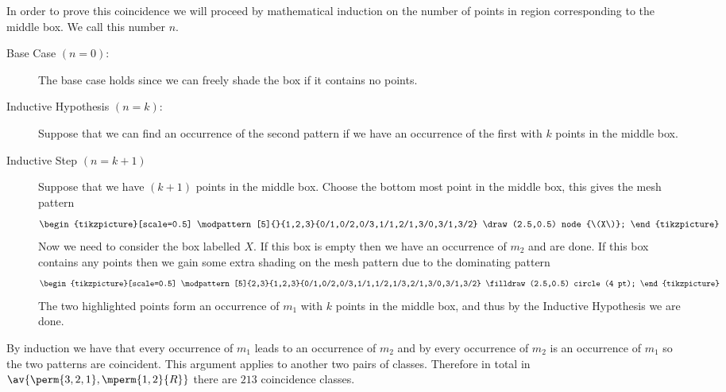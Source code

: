In order to prove this coincidence we will proceed by mathematical
induction on the number of points in region corresponding to the middle box.
We call this number \(n\).
\begin{description}
    \item [Base Case \((n=0)\):] The base case holds since we can freely shade the
        box if it contains no points.
    \item [Inductive Hypothesis \((n=k)\):] Suppose that we can find an occurrence
        of the second pattern if we have an occurrence of the first with \(k\) points
        in the middle box.
    \item [Inductive Step \((n=k+1)\)] Suppose that we have \((k+1)\) points in
        the middle box. Choose the bottom most point in the middle box, this gives the
        mesh pattern
     \begin{equation*}
        \begin{tikzpicture}[scale=0.5]
            \modpattern[5]{}{1,2,3}{0/1,0/2,0/3,1/1,2/1,3/0,3/1,3/2}
            \draw (2.5,0.5) node {\(X\)};
        \end{tikzpicture}
    \end{equation*}
        Now we need to consider the box labelled \(X\). If this box is empty then
        we have an occurrence of \(m_2\) and are done. If this box contains
        any points then we gain some extra shading on the mesh pattern
        due to the dominating pattern
     \begin{equation*}
        \begin{tikzpicture}[scale=0.5]
            \modpattern[5]{2,3}{1,2,3}{0/1,0/2,0/3,1/1,1/2,1/3,2/1,3/0,3/1,3/2}
            \filldraw (2.5,0.5) circle (4 pt);
        \end{tikzpicture}
    \end{equation*}
        The two highlighted points form an occurrence of \(m_1\) with \(k\)
        points in the middle box, and thus by the Inductive Hypothesis we
        are done.
\end{description}
By induction we have that every occurrence of \(m_1\) leads to an occurrence of \(m_2\)
and by  every occurrence of \(m_2\) is an occurrence of
\(m_1\) so the two patterns are coincident.
This argument applies to another two pairs of classes. Therefore in
total in \(\av{\perm{3,2,1}, \mperm{1,2}{R}}\) there are \(213\) coincidence
classes.
